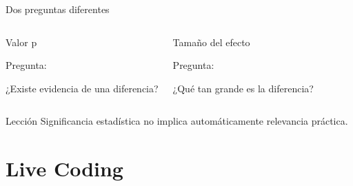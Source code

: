 \documentclass[aspectratio=169,11pt]{beamer}
\begin{document}

\begin{frame}{Dos preguntas diferentes}

\begin{columns}


\begin{block}{Valor p}

Pregunta:

\begin{center}

¿Existe evidencia de una diferencia?

\end{center}

\end{block}


\begin{exampleblock}{Tamaño del efecto}

Pregunta:

\begin{center}

¿Qué tan grande es la diferencia?

\end{center}

\end{exampleblock}

\end{columns}

\vspace{0.4cm}

\begin{alertblock}{Lección}
Significancia estadística no implica automáticamente relevancia práctica.
\end{alertblock}

\end{frame}

\section{Live Coding}
\end{document}
